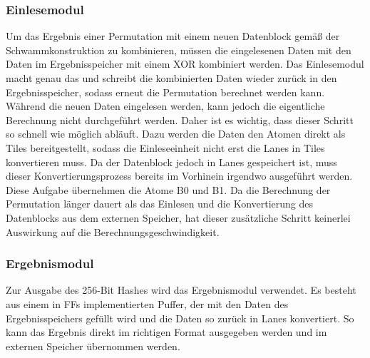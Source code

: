 \subsubsection{Einlesemodul}
Um das Ergebnis einer Permutation mit einem neuen Datenblock gemäß der Schwammkonstruktion zu kombinieren, müssen die eingelesenen Daten mit den Daten im Ergebnisspeicher mit einem XOR kombiniert werden.
Das Einlesemodul macht genau das und schreibt die kombinierten Daten wieder zurück in den Ergebnisspeicher, sodass erneut die Permutation berechnet werden kann.
Während die neuen Daten eingelesen werden, kann jedoch die eigentliche Berechnung nicht durchgeführt werden. Daher ist es wichtig, dass dieser Schritt so schnell wie möglich abläuft.
Dazu werden die Daten den Atomen direkt als Tiles bereitgestellt, sodass die Einleseeinheit nicht erst die Lanes in Tiles konvertieren muss. Da der Datenblock jedoch in Lanes gespeichert ist,
muss dieser Konvertierungsprozess bereits im Vorhinein irgendwo ausgeführt werden.
Diese Aufgabe übernehmen die Atome B0 und B1. Da die Berechnung der Permutation länger dauert als das Einlesen und die Konvertierung des Datenblocks aus dem externen Speicher,
hat dieser zusätzliche Schritt keinerlei Auswirkung auf die Berechnungsgeschwindigkeit.

\subsubsection{Ergebnismodul}
Zur Ausgabe des 256-Bit Hashes wird das Ergebnismodul verwendet. Es besteht aus einem in FFs implementierten Puffer, der mit den Daten des Ergebnisspeichers gefüllt wird und die Daten so zurück in Lanes konvertiert.
So kann das Ergebnis direkt im richtigen Format ausgegeben werden und im externen Speicher übernommen werden.


